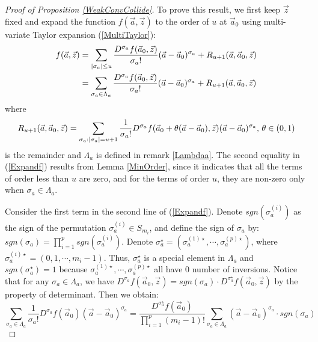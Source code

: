 \begin{proof}[Proof of Proposition \ref{WeakConvCollide}]
To prove this result, we first keep $\vec{z}$ fixed and expand the function $f(\vec{a},\vec{z})$ to the order of $u$ at $\vec{a}_{0}$ using multi-variate Taylor expansion (\ref{MultiTaylor}):
\begin{equation}{\label{Expandf}}
	\begin{split}
		f(\vec{a},\vec{z})&=\sum_{|\sigma_{a}|\leq u}\frac{D^{\sigma_{a}}f(\vec{a}_{0},\vec{z})}{\sigma_{a}!}(\vec{a}-\vec{a}_{0})^{\sigma_{a}}+R_{u+1}(\vec{a},\vec{a}_{0},\vec{z})\\
	&= \sum_{\sigma_{a}\in \Lambda_{a}}\frac{D^{\sigma_{a}}f(\vec{a}_{0},\vec{z})}{\sigma_{a}!}(\vec{a}-\vec{a}_{0})^{\sigma_{a}}+R_{u+1}(\vec{a},\vec{a}_{0},\vec{z})
	\end{split}
\end{equation}
where 
\begin{equation}{\label{remainder}}
	R_{u+1}(\vec{a},\vec{a}_{0},\vec{z})=\sum_{\sigma_{a}:|\sigma_{a}|=u+1}\frac{1}{\sigma_{a}!}D^{\sigma_{a}}f(\vec{a}_{0}+\theta(\vec{a}-\vec{a}_{0}),\vec{z})(\vec{a}-\vec{a}_{0})^{\sigma_{a}}\text{, }\theta\in(0,1)
\end{equation} 
is the remainder and $\Lambda_{a}$ is defined in remark \ref{Lambdaa}. The second equality in (\ref{Expandf}) results from Lemma \ref{MinOrder}, since it indicates that all the terms of order less than $u$ are zero, and for the terms of order $u$, they are non-zero only when $\sigma_{a}\in\Lambda_{a}$.

Consider the first term in the second line of (\ref{Expandf}). Denote $sgn(\sigma_{a}^{(i)})$ as the sign of the permutation $\sigma_{a}^{(i)}\in S_{m_i}$, and define the sign of $\sigma_{a}$ by: $sgn(\sigma_{a})=\prod_{i=1}^{p}sgn(\sigma_{a}^{(i)})$. Denote $\sigma_{a}^{\star}=\left(\sigma_{a}^{(1)\star},\cdots,\sigma_{a}^{(p)\star}\right)$, where $\sigma_{a}^{(i)\star}=(0,1,\cdots,m_i-1)$. Thus, $\sigma_{a}^{\star}$ is a special element in $\Lambda_{a}$ and $sgn(\sigma_{a}^{\star})=1$ because $\sigma_{a}^{(1)\star},\cdots,\sigma_{a}^{(p)\star}$ all have $0$ number of inversions. Notice that for any $\sigma_{a}\in\Lambda_{a}$, we have $D^{\sigma_{a}}f(\vec{a}_{0},\vec{z})=sgn(\sigma_{a})\cdot D^{\sigma_{a}^{\star}}f(\vec{a}_{0},\vec{z})$ by the property of determinant. Then we obtain:
\begin{equation*}
	\sum_{\sigma_{a}\in\Lambda_{a}}\frac{1}{\sigma_{a}!}D^{\sigma_{a}}f(\vec{a}_{0})(\vec{a}-\vec{a}_{0})^{\sigma_{a}}=\frac{D^{\sigma_{a}^{\star}}f(\vec{a}_{0})}{\prod_{i=1}^{p}(m_{i}-1)!}\sum_{\sigma_{a}\in\Lambda_{a}}(\vec{a}-\vec{a}_{0})^{\sigma_{a}}\cdot sgn(\sigma_{a})
\end{equation*}


\end{proof}

